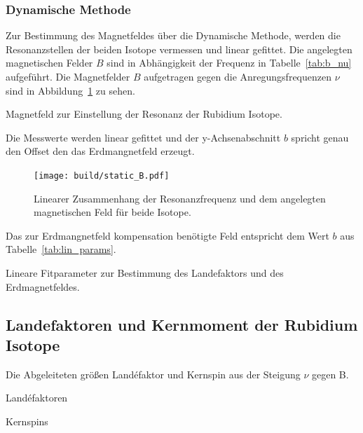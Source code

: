 \subsubsection{Dynamische Methode}%
\label{ssub:dynamische_methode}
Zur Bestimmung des Magnetfeldes über die Dynamische Methode, werden die
Resonanzstellen der beiden Isotope vermessen und linear gefittet.
Die angelegten magnetischen Felder $B$ sind in Abhängigkeit der Frequenz in
Tabelle~\ref{tab:b_nu} aufgeführt.
Die Magnetfelder $B$ aufgetragen gegen die Anregungsfrequenzen $\nu$ sind in
Abbildung~\ref{fig:static_B} zu sehen.

\begin{table}[h]
	\centering
	\caption{Magnetfeld zur Einstellung der Resonanz der Rubidium Isotope.}
	\label{tab:b_nu}
		
\end{table}

Die Messwerte werden linear gefittet und der y-Achsenabschnitt $b$ spricht genau den
Offset den das Erdmangnetfeld erzeugt.
\begin{figure}[h]
	\centering
	\texttt{[image: build/static\_B.pdf]}
	\caption{Linearer Zusammenhang der Resonanzfrequenz und dem angelegten
	magnetischen Feld für beide Isotope.}
	\label{fig:static_B}
\end{figure}
Das zur Erdmangnetfeld kompensation benötigte Feld entspricht dem Wert $b$ aus
Tabelle~\ref{tab:lin_params}.

\begin{table}[h]
	\centering
	\caption{Lineare Fitparameter zur Bestimmung des Landefaktors und des
	Erdmagnetfeldes.}
	\label{tab:lin_params}
	
\end{table}



\subsection{Landefaktoren und Kernmoment der Rubidium Isotope}%
\label{sub:landefaktoren_der_rubidium_isotope}


\begin{table}[h]
	\centering
	\caption{Die Abgeleiteten größen Land\'efaktor und Kernspin aus der Steigung
	$\nu$ gegen B.}
	\label{tab:label}
	\begin{subtable}[t]{0.4\textwidth}
	\centering
	\caption{Land\'efaktoren}
	\label{tab:label}
	
	\end{subtable}
	\begin{subtable}[t]{0.4\textwidth}
	\centering
	\caption{Kernspins}
	\label{tab:label}
	
	\end{subtable}
\end{table}


